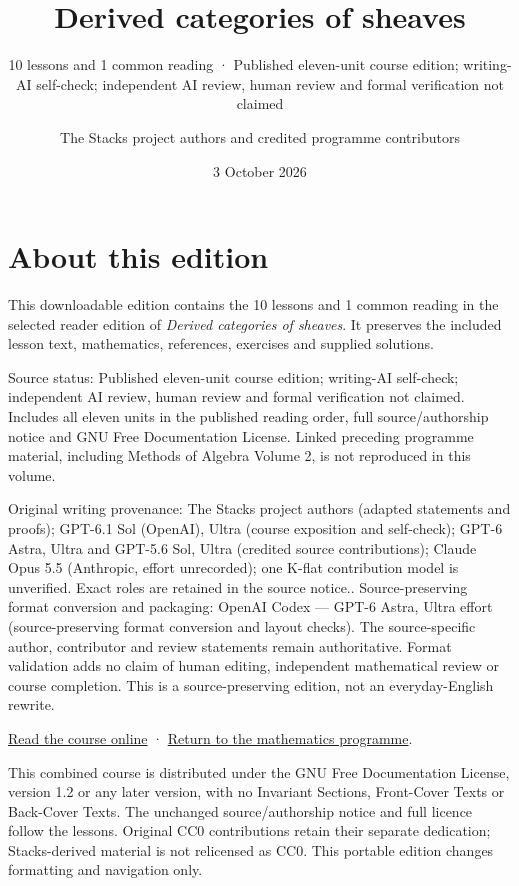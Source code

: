 \documentclass[
  english,
  11pt,
  a4paper,
]{article}
\title{Derived categories of sheaves}
\subtitle{10 lessons and 1 common reading · Published eleven-unit course
edition; writing-AI self-check; independent AI review, human review and
formal verification not claimed}
\author{The Stacks project authors and credited programme contributors}
\date{3 October 2026}
\begin{document}
\maketitle

{
\setcounter{tocdepth}{2}
\tableofcontents
}
\section*{About this edition}\label{about-edition}

This downloadable edition contains the 10 lessons and 1 common reading
in the selected reader edition of \emph{Derived categories of sheaves}.
It preserves the included lesson text, mathematics, references,
exercises and supplied solutions.

Source status: Published eleven-unit course edition; writing-AI
self-check; independent AI review, human review and formal verification
not claimed. Includes all eleven units in the published reading order,
full source/authorship notice and GNU Free Documentation License. Linked
preceding programme material, including Methods of Algebra Volume 2, is
not reproduced in this volume.

Original writing provenance: The Stacks project authors (adapted
statements and proofs); GPT-6.1 Sol (OpenAI), Ultra (course exposition
and self-check); GPT-6 Astra, Ultra and GPT-5.6 Sol, Ultra (credited
source contributions); Claude Opus 5.5 (Anthropic, effort unrecorded);
one K-flat contribution model is unverified. Exact roles are retained in
the source notice.. Source-preserving format conversion and packaging:
OpenAI Codex --- GPT-6 Astra, Ultra effort (source-preserving format
conversion and layout checks). The source-specific author, contributor
and review statements remain authoritative. Format validation adds no
claim of human editing, independent mathematical review or course
completion. This is a source-preserving edition, not an everyday-English
rewrite.

\href{https://kokunoyumeto.github.io/open-math-courses/courses/derived-categories-and-sheaf-operations/}{Read
the course online} ·
\href{https://kokunoyumeto.github.io/program-matematika-indonesia/en/}{Return
to the mathematics programme}.

This combined course is distributed under the GNU Free Documentation
License, version 1.2 or any later version, with no Invariant Sections,
Front-Cover Texts or Back-Cover Texts. The unchanged source/authorship
notice and full licence follow the lessons. Original CC0 contributions
retain their separate dedication; Stacks-derived material is not
relicensed as CC0. This portable edition changes formatting and
navigation only.
\end{document}
